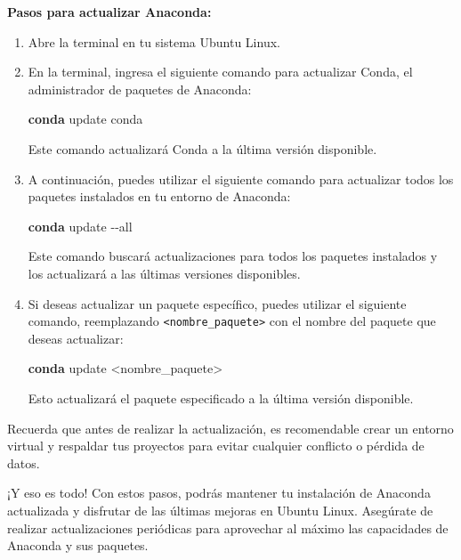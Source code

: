 \documentclass[
  letterpaper,
  DIV=11,
  numbers=noendperiod]{scrartcl}
\newenvironment{Shaded}{}{}
\newcommand{\AttributeTok}[1]{\textcolor[rgb]{0.84,0.23,0.29}{#1}}
\newcommand{\ExtensionTok}[1]{\textcolor[rgb]{0.84,0.23,0.29}{\textbf{#1}}}
\newcommand{\NormalTok}[1]{\textcolor[rgb]{0.14,0.16,0.18}{#1}}
\newcommand{\OperatorTok}[1]{\textcolor[rgb]{0.14,0.16,0.18}{#1}}
\begin{document}
\textbf{Pasos para actualizar Anaconda:}

\begin{enumerate}
\def\labelenumi{\arabic{enumi}.}
\item
  Abre la terminal en tu sistema Ubuntu Linux.
\item
  En la terminal, ingresa el siguiente comando para actualizar Conda, el
  administrador de paquetes de Anaconda:

\begin{Shaded}
\begin{Highlighting}[]
\ExtensionTok{conda}\NormalTok{ update conda}
\end{Highlighting}
\end{Shaded}

  Este comando actualizará Conda a la última versión disponible.
\item
  A continuación, puedes utilizar el siguiente comando para actualizar
  todos los paquetes instalados en tu entorno de Anaconda:

\begin{Shaded}
\begin{Highlighting}[]
\ExtensionTok{conda}\NormalTok{ update }\AttributeTok{{-}{-}all}
\end{Highlighting}
\end{Shaded}

  Este comando buscará actualizaciones para todos los paquetes
  instalados y los actualizará a las últimas versiones disponibles.
\item
  Si deseas actualizar un paquete específico, puedes utilizar el
  siguiente comando, reemplazando
  \texttt{\textless{}nombre\_paquete\textgreater{}} con el nombre del
  paquete que deseas actualizar:

\begin{Shaded}
\begin{Highlighting}[]
\ExtensionTok{conda}\NormalTok{ update }\OperatorTok{\textless{}}\NormalTok{nombre\_paquete}\OperatorTok{\textgreater{}}
\end{Highlighting}
\end{Shaded}

  Esto actualizará el paquete especificado a la última versión
  disponible.
\end{enumerate}

Recuerda que antes de realizar la actualización, es recomendable crear
un entorno virtual y respaldar tus proyectos para evitar cualquier
conflicto o pérdida de datos.

¡Y eso es todo! Con estos pasos, podrás mantener tu instalación de
Anaconda actualizada y disfrutar de las últimas mejoras en Ubuntu Linux.
Asegúrate de realizar actualizaciones periódicas para aprovechar al
máximo las capacidades de Anaconda y sus paquetes.
\end{document}
